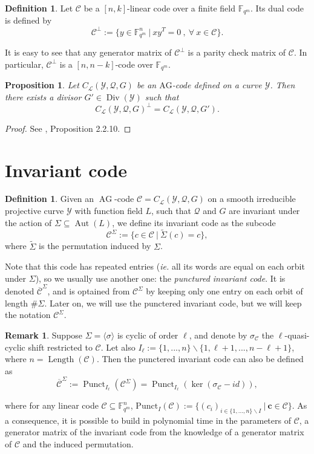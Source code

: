 \documentclass[10pt]{article}
\newtheorem{prop1}[thm]{Proposition}
\theoremstyle{definition}
\newtheorem{rq1}[thm]{Remark}
\theoremstyle{definition}
\theoremstyle{definition}
\newtheorem{def1}[thm]{Definition}
\newcommand{\C}{\mathcal{C}}
\newcommand{\fqm}{\mathbb{F}_{q^m}}
\newcommand{\su}{\subseteq}
\newcommand{\Y}{\mathcal{Y}}
\newcommand{\QR}{\mathcal{Q}}
\newcommand{\Div}{\operatorname{Div}}
\newcommand{\Aut}{\operatorname{Aut}}
\newcommand{\ag}{\operatorname{AG}}
\newcommand{\calL}{\mathcal{L}}
\begin{document}
\begin{def1}
Let $\mathcal{C}$ be a $[n,k]$-linear code over a finite field $\fqm$. Its dual code is defined by 
\[\mathcal{C}^{\perp} := \{ y \in \fqm^n \ | \ xy^T = 0 \ , \ \forall \ x \in \mathcal{C}\}.\]
\end{def1}
It is easy to see that any generator matrix of $\mathcal{C}^{\perp}$ is a parity check matrix of $\mathcal{C}$. In particular, $\mathcal{C}^{\perp}$ is a $[n,n-k]$-code over $\fqm$.


\begin{prop1} \label{dual}
Let $C_{\calL}(\Y,\QR,G)$ be an $\mathrm{AG}$-code defined on a curve $\Y$. Then there exists a divisor $G' \in \Div(\Y)$ such that 
\[C_{\calL}(\Y,\QR,G)^{\perp} = C_{\calL}(\Y,\QR,G').\]
\end{prop1}

\begin{proof}
See \cite{Sti}, Proposition 2.2.10.
\end{proof}


\section{Invariant code}


\begin{def1} Given an $\ag$-code $\mathcal{C} = C_{\calL}(\Y,\QR,G)$ on a smooth irreducible projective curve $\Y$ with function field $L$, such that $\QR$ and $G$ are invariant under the action of $\Sigma \su \Aut(L)$, we define its invariant code as the subcode 
\[\mathcal{C}^{\Sigma} := \{c \in \mathcal{C} \ | \ \tilde{\Sigma}(c)=c\},\]
where $\tilde{\Sigma}$ is the permutation induced by $\Sigma$.
\end{def1}


Note that this code has repeated entries (\textit{ie.} all its words are equal on each orbit under $\Sigma$), so we usually use another one: the \emph{punctured invariant code}. It is denoted $\overline{\mathcal{C}}^{\Sigma}$, and is optained from $\C^{\Sigma}$ by keeping only one entry on each orbit of length $\#\Sigma$. Later on, we will use the punctered invariant code, but we will keep the notation $\mathcal{C}^{\Sigma}$. 

\begin{rq1}  \label{gen inv}
Suppose $\Sigma = \langle \sigma \rangle$ is cyclic of order $\ell$, and denote by $\sigma_{\mathcal{C}}$ the $\ell$-quasi-cyclic shift restricted to $\mathcal{C}$. Let also $I_{\ell} := \{1,...,n\}\backslash \{1,\ell+1,...,n-\ell+1\}$, where $n=\operatorname{Length}(\mathcal{C})$. Then the punctered invariant code can also be defined as
\[ \overline{\mathcal{C}}^{\Sigma} := \operatorname{Punct}_{I_{\ell}}(\mathcal{C}^{\Sigma}) = \operatorname{Punct}_{ I_{\ell}}(\ker (\sigma_{\mathcal{C}}-id)),\]

\noindent where for any linear code $\mathcal{C} \su \fqm^n$, $\mathrm{Punct}_I(\mathcal{C}):= \{(c_i)_{i \in \{1,...,n\}\backslash I} \ | \ \mathbf{c} \in \mathcal{C}\}$. 
As a consequence, it is possible to build in polynomial time in the parameters of $\mathcal{C}$, a generator matrix of the invariant code from the knowledge of a generator matrix of $\mathcal{C}$ and the induced permutation. 
\end{rq1}
\end{document}

